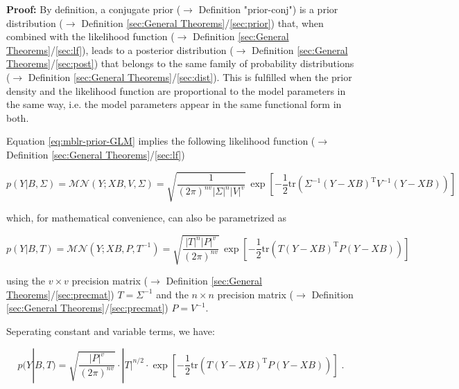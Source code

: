 \documentclass[a4paper,12pt,twoside]{book}
\begin{document}
\vspace{1em}
\textbf{Proof:} By definition, a conjugate prior ($\rightarrow$ Definition "prior-conj") is a prior distribution ($\rightarrow$ Definition \ref{sec:General Theorems}/\ref{sec:prior}) that, when combined with the likelihood function ($\rightarrow$ Definition \ref{sec:General Theorems}/\ref{sec:lf}), leads to a posterior distribution ($\rightarrow$ Definition \ref{sec:General Theorems}/\ref{sec:post}) that belongs to the same family of probability distributions ($\rightarrow$ Definition \ref{sec:General Theorems}/\ref{sec:dist}). This is fulfilled when the prior density and the likelihood function are proportional to the model parameters in the same way, i.e. the model parameters appear in the same functional form in both.

Equation \eqref{eq:mblr-prior-GLM} implies the following likelihood function ($\rightarrow$ Definition \ref{sec:General Theorems}/\ref{sec:lf})

\begin{equation} \label{eq:mblr-prior-GLM-LF-Class}
p(Y|B,\Sigma) = \mathcal{MN}(Y; X B, V, \Sigma) = \sqrt{\frac{1}{(2 \pi)^{nv} |\Sigma|^n |V|^v}} \, \exp\left[ -\frac{1}{2} \mathrm{tr}\left( \Sigma^{-1} (Y-XB)^\mathrm{T} V^{-1} (Y-XB) \right) \right]
\end{equation}

which, for mathematical convenience, can also be parametrized as

\begin{equation} \label{eq:mblr-prior-GLM-LF-Bayes}
p(Y|B,T) = \mathcal{MN}(Y; X B, P, T^{-1}) = \sqrt{\frac{|T|^n |P|^v}{(2 \pi)^{nv}}} \, \exp\left[ -\frac{1}{2} \mathrm{tr}\left( T (Y-XB)^\mathrm{T} P (Y-XB) \right) \right]
\end{equation}

using the $v \times v$ precision matrix ($\rightarrow$ Definition \ref{sec:General Theorems}/\ref{sec:precmat}) $T = \Sigma^{-1}$ and the $n \times n$ precision matrix ($\rightarrow$ Definition \ref{sec:General Theorems}/\ref{sec:precmat}) $P = V^{-1}$.

\vspace{1em}
Seperating constant and variable terms, we have:

\begin{equation} \label{eq:mblr-prior-GLM-LF-s1}
p(Y|B,T) = \sqrt{\frac{|P|^v}{(2 \pi)^{nv}}} \cdot |T|^{n/2} \cdot \exp\left[ -\frac{1}{2} \mathrm{tr}\left( T (Y-XB)^\mathrm{T} P (Y-XB) \right) \right] \; .
\end{equation}
\end{document}
